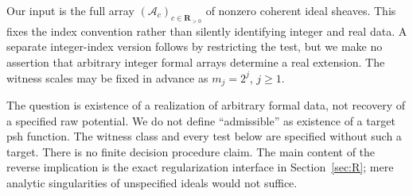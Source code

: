 \documentclass[11pt]{article}
\newcommand{\A}{\mathcal A}
\theoremstyle{definition}
\begin{document}
Our input is the full array $(\A_c)_{c\in\mathbf R_{>0}}$ of nonzero
coherent ideal sheaves. This fixes the index convention rather than
silently identifying integer and real data. A separate integer-index
version follows by restricting the test, but we make no assertion
that arbitrary integer formal arrays determine a real extension.
The witness scales may be fixed in advance as $m_j=2^j$, $j\geq1$.

The question is existence of a realization of arbitrary formal data,
not recovery of a specified raw potential. We do not define
``admissible'' as existence of a target psh function. The witness
class and every test below are specified without such a target.
There is no finite decision procedure claim. The main content of the
reverse implication is the exact regularization interface in
Section~\ref{sec:R}; mere analytic singularities of unspecified
ideals would not suffice.
\end{document}
